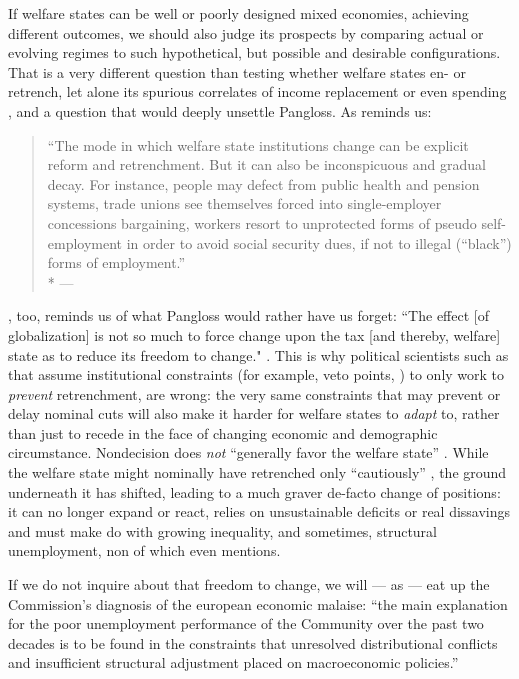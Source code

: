 If welfare states can be well or poorly designed mixed economies, achieving different outcomes, we should also judge its prospects by comparing actual or evolving regimes to such hypothetical, but possible and desirable configurations.
That is a very different question than testing whether welfare states en- or retrench, let alone its spurious correlates of income replacement \citep{Swank-2005-aa} or even spending \citep[24]{Kleinman2002}, and a question that would deeply unsettle Pangloss.
As \citeauthor{Offe2003} reminds us:
\begin{quote}
	``The mode in which welfare state institutions change can be explicit reform and retrenchment.
But it can also be inconspicuous and gradual decay.
	For instance, people may defect from public health and pension systems, trade unions see themselves forced into single-employer concessions bargaining, workers resort to unprotected forms of pseudo self-employment in order to avoid social security dues, if not to illegal (“black”) forms of employment.''
	\\*
	--- \citet[364]{Offe2003}
\end{quote}
\citeauthor{Genschel2005}, too, reminds us of what Pangloss would rather have us forget:
``The effect [of globalization] is not so much to force change upon the tax [and thereby, welfare] state as to reduce its freedom to change." \citeyearpar[53]{Genschel2005}.
This is  why political scientists such as \cite{Pierson2002,Pierson1996} that assume institutional constraints (for example, veto points, \citealt{Tsebelis-2002-aa}) to only work to \emph{prevent} retrenchment, are wrong:
the very same constraints that may prevent or delay nominal cuts will also make it harder for welfare states to \emph{adapt} to, rather than just to recede in the face of changing economic and demographic circumstance.
Nondecision does \emph{not} ``generally favor the welfare state'' \citep[174]{Pierson1996}.
While the welfare state might nominally have retrenched only ``cautiously'' \citep[174]{Pierson1996}, the ground underneath it has shifted, leading to a much graver de-facto change of positions:
it can no longer expand or react, relies on unsustainable deficits or real dissavings and must make do with growing inequality, and sometimes, structural unemployment, non of which \citeauthor{Pierson1996} even mentions.

If we do not inquire about that freedom to change, we will --- as \citet[99]{Kleinman2002} --- eat up the Commission's diagnosis of the european economic malaise:
``the main explanation for the poor unemployment performance of the Community over the past two decades is to be found in the constraints that unresolved distributional conflicts and insufficient structural adjustment placed on macroeconomic policies.''

